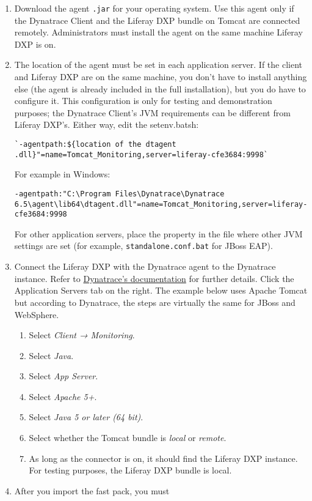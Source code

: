 \begin{enumerate}
\def\labelenumi{\arabic{enumi}.}
\item
  Download the agent \texttt{.jar} for your operating system. Use this
  agent only if the Dynatrace Client and the Liferay DXP bundle on
  Tomcat are connected remotely. Administrators must install the agent
  on the same machine Liferay DXP is on.
\item
  The location of the agent must be set in each application server. If
  the client and Liferay DXP are on the same machine, you don't have to
  install anything else (the agent is already included in the full
  installation), but you do have to configure it. This configuration is
  only for testing and demonstration purposes; the Dynatrace Client's
  JVM requirements can be different from Liferay DXP's. Either way, edit
  the setenv.bat\textbar sh:

\begin{verbatim}
`-agentpath:${location of the dtagent .dll}"=name=Tomcat_Monitoring,server=liferay-cfe3684:9998`    
\end{verbatim}

  For example in Windows:

\begin{verbatim}
-agentpath:"C:\Program Files\Dynatrace\Dynatrace 6.5\agent\lib64\dtagent.dll"=name=Tomcat_Monitoring,server=liferay-cfe3684:9998     
\end{verbatim}

  For other application servers, place the property in the file where
  other JVM settings are set (for example, \texttt{standalone.conf.bat}
  for JBoss EAP).
\item
  Connect the Liferay DXP with the Dynatrace agent to the Dynatrace
  instance. Refer to
  \href{https://community.dynatrace.com/community/display/EVAL/Step+3+-+Connect+Agent+to+Dynatrace}{Dynatrace's
  documentation} for further details. Click the Application Servers tab
  on the right. The example below uses Apache Tomcat but according to
  Dynatrace, the steps are virtually the same for JBoss and WebSphere.

  \begin{enumerate}
  \def\labelenumii{\alph{enumii}.}
  \tightlist
  \item
    Select \emph{Client → Monitoring}.
  \item
    Select \emph{Java}.
  \item
    Select \emph{App Server}.
  \item
    Select \emph{Apache 5+}.
  \item
    Select \emph{Java 5 or later (64 bit)}.
  \item
    Select whether the Tomcat bundle is \emph{local} or \emph{remote}.
  \item
    As long as the connector is on, it should find the Liferay DXP
    instance. For testing purposes, the Liferay DXP bundle is local.
  \end{enumerate}
\item
  After you import the fast pack, you must


\end{enumerate}
